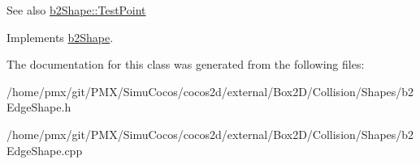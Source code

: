 \begin{DoxySeeAlso}{See also}
\hyperlink{classb2Shape_a6ac968e403e2d93e8ae46d728a2e50fa}{b2\+Shape\+::\+Test\+Point} 
\end{DoxySeeAlso}


Implements \hyperlink{classb2Shape_a6ac968e403e2d93e8ae46d728a2e50fa}{b2\+Shape}.



The documentation for this class was generated from the following files\+:\begin{DoxyCompactItemize}
\item 
/home/pmx/git/\+P\+M\+X/\+Simu\+Cocos/cocos2d/external/\+Box2\+D/\+Collision/\+Shapes/b2\+Edge\+Shape.\+h\item 
/home/pmx/git/\+P\+M\+X/\+Simu\+Cocos/cocos2d/external/\+Box2\+D/\+Collision/\+Shapes/b2\+Edge\+Shape.\+cpp\end{DoxyCompactItemize}
